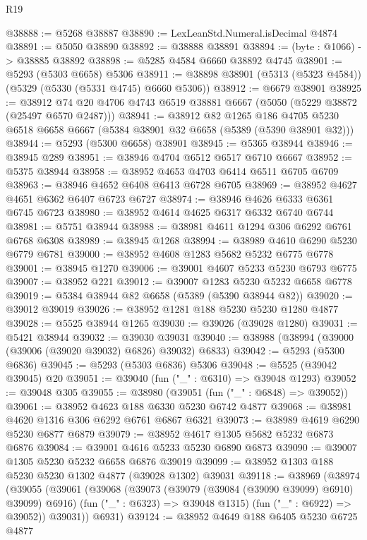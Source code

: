 \begin{lexlean}{R19}
\begin{coremodule}
@38888 := @5268 @38887
@38890 := LexLeanStd.Numeral.isDecimal @4874
@38891 := @5050 @38890
@38892 := @38888 @38891
@38894 := (byte : @1066) -> @38885 @38892
@38898 := @5285 @4584 @6660 @38892 @4745
@38901 := @5293 (@5303 @6658) @5306
@38911 := @38898 @38901 (@5313 (@5323 @4584)) (@5329 (@5330 (@5331 @4745) @6660 @5306))
@38912 := @6679 @38901
@38925 := @38912 @74 @20 @4706 @4743 @6519 @38881 @6667 (@5050 (@5229 @38872 (@25497 @6570 @2487)))
@38941 := @38912
    @82
    @1265
    @186
    @4705
    @5230
    @6518
    @6658
    @6667
    (@5384 @38901 @32 @6658 (@5389 (@5390 @38901 @32)))
@38944 := @5293 (@5300 @6658) @38901
@38945 := @5365 @38944
@38946 := @38945 @289
@38951 := @38946 @4704 @6512 @6517 @6710 @6667
@38952 := @5375 @38944
@38958 := @38952 @4653 @4703 @6414 @6511 @6705 @6709
@38963 := @38946 @4652 @6408 @6413 @6728 @6705
@38969 := @38952 @4627 @4651 @6362 @6407 @6723 @6727
@38974 := @38946 @4626 @6333 @6361 @6745 @6723
@38980 := @38952 @4614 @4625 @6317 @6332 @6740 @6744
@38981 := @5751 @38944
@38988 := @38981 @4611 @1294 @306 @6292 @6761 @6768 @6308
@38989 := @38945 @1268
@38994 := @38989 @4610 @6290 @5230 @6779 @6781
@39000 := @38952 @4608 @1283 @5682 @5232 @6775 @6778
@39001 := @38945 @1270
@39006 := @39001 @4607 @5233 @5230 @6793 @6775
@39007 := @38952 @221
@39012 := @39007 @1283 @5230 @5232 @6658 @6778
@39019 := @5384 @38944 @82 @6658 (@5389 (@5390 @38944 @82))
@39020 := @39012 @39019
@39026 := @38952 @1281 @188 @5230 @5230 @1280 @4877
@39028 := @5525 @38944 @1265
@39030 := @39026 (@39028 @1280)
@39031 := @5421 @38944
@39032 := @39030 @39031
@39040 := @38988 (@38994 (@39000 (@39006 (@39020 @39032) @6826) @39032) @6833)
@39042 := @5293 (@5300 @6836)
@39045 := @5293 (@5303 @6836) @5306
@39048 := @5525 (@39042 @39045) @20
@39051 := @39040 (fun ("_" : @6310) => @39048 @1293)
@39052 := @39048 @305
@39055 := @38980 (@39051 (fun ("_" : @6848) => @39052))
@39061 := @38952 @4623 @188 @6330 @5230 @6742 @4877
@39068 := @38981 @4620 @1316 @306 @6292 @6761 @6867 @6321
@39073 := @38989 @4619 @6290 @5230 @6877 @6879
@39079 := @38952 @4617 @1305 @5682 @5232 @6873 @6876
@39084 := @39001 @4616 @5233 @5230 @6890 @6873
@39090 := @39007 @1305 @5230 @5232 @6658 @6876 @39019
@39099 := @38952 @1303 @188 @5230 @5230 @1302 @4877 (@39028 @1302) @39031
@39118 := @38969
    (@38974
      (@39055
        (@39061
          (@39068
            (@39073 (@39079 (@39084 (@39090 @39099) @6910) @39099) @6916)
            (fun ("_" : @6323) => @39048 @1315)
            (fun ("_" : @6922) => @39052))
          @39031))
      @6931)
@39124 := @38952 @4649 @188 @6405 @5230 @6725 @4877

\end{coremodule}
\end{lexlean}
